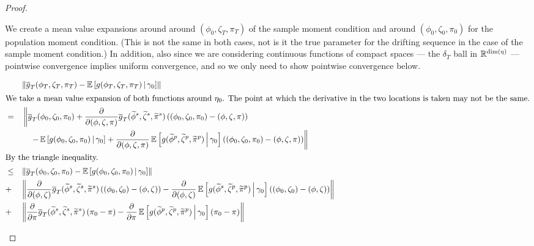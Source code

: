 \documentclass[11pt, letterpaper, twoside, final]{article}
\begin{document}
\begin{appendices}
\begin{proof}
\begin{proofpart}
    We create a mean value expansions around around $(\phi_0, \zeta_T, \pi_T)$ of the sample moment condition and
    around $(\phi_0, \zeta_0, \pi_0)$ for the population moment condition.
    (This is not the same in both cases, not is it the true parameter for the drifting sequence in the case of the
    sample moment condition.)
    In addition, also since we are considering continuous functions of compact spaces --- the $\delta_T$ ball in
    $\mathbb{R}^{\dim(\eta)}$ --- pointwise convergence implies uniform convergence, and so we only need to show pointwise
    convergence below.

    \begin{alignat}{2}
        & &&\norm*{\sampmom(\phi_T, \zeta_T, \pi_T) -  \E\left[\popmom(\phi_T, \zeta_T, \pi_T) \mvert
          \gamma_0\right] } \\ 
        \intertext{We take a mean value expansion of both functions around $\eta_0$. The point at which the
        derivative in the two locations is taken may not be the same.}
        &= &&\left\lVert \sampmom(\phi_0, \zeta_0, \pi_0) + \frac{\partial}{\partial (\phi, \zeta,
           \pi)}\sampmom(\widetilde{\phi}^s, \widetilde{\zeta}^s, \widetilde{\pi}^s)\left((\phi_0, \zeta_0, \pi_0)
            - (\phi, \zeta, \pi)\right)\right. \\
        &  &&\quad \left. - \E\left[\popmom(\phi_0, \zeta_0, \pi_0) \mvert \gamma_0\right] + 
           \frac{\partial}{\partial (\phi, \zeta, \pi)} \E\left[\popmom(\widetilde{\phi}^p, \widetilde{\zeta}^p,
           \widetilde{\pi}^p)\mvert \gamma_0\right] \left((\phi_0, \zeta_0, \pi_0) - (\phi, \zeta,
           \pi)\right) \right\rVert \\ 
        \intertext{By the triangle inequality.}
        &\leq && \norm*{\sampmom(\phi_0, \zeta_0, \pi_0) - \E\left[\popmom(\phi_0, \zeta_0, \pi_0) \mvert
           \gamma_0\right]}  \\
        &+  && \norm*{\frac{\partial}{\partial (\phi, \zeta)}\sampmom(\widetilde{\phi}^s, \widetilde{\zeta}^s,
          \widetilde{\pi}^s)\left((\phi_0, \zeta_0)  - (\phi, \zeta)\right) -  \frac{\partial}{\partial (\phi,
          \zeta)} \E\left[\popmom(\widetilde{\phi}^s, \widetilde{\zeta}^p, \widetilde{\pi}^p)\mvert \gamma_0\right]
          \left((\phi_0, \zeta_0) - (\phi, \zeta)\right)} \\
        &+  && \norm*{\frac{\partial}{\partial \pi}\sampmom(\widetilde{\phi}^s, \widetilde{\zeta}^s,
          \widetilde{\pi}^s)\left(\pi_0 - \pi\right) -  \frac{\partial}{\partial \pi}
          \E\left[\popmom(\widetilde{\phi}^p, \widetilde{\zeta}^p, \widetilde{\pi}^p)\mvert \gamma_0\right]
          \left(\pi_0 - \pi\right)} 
          \label{eqn:pi_derivative_term}
    \end{alignat}


\end{proofpart}
\end{proof}
\end{appendices}
\end{document}
